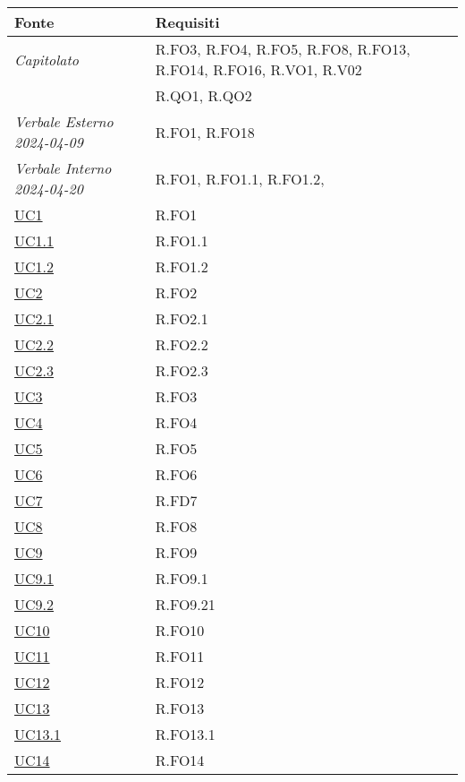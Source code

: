 \begin{longtable}{|P{4,5cm}|>{\arraybackslash}P{9cm}|}
  \hline
  \textbf{Fonte} & \textbf{Requisiti} \\
  \hline
  \emph{Capitolato} & R.FO3, R.FO4, R.FO5, R.FO8, R.FO13, R.FO14, R.FO16, R.VO1, R.V02 \\
  \hline
  \NdP{} & R.QO1, R.QO2 \\
  \hline
  \emph{Verbale Esterno 2024-04-09} & R.FO1, R.FO18 \\
  \hline
  \emph{Verbale Interno 2024-04-20} & R.FO1, R.FO1.1, R.FO1.2,  \\
  \hline
  \hyperref[UC1]{UC1} & R.FO1 \\
  \hline
  \hyperref[UC1point1]{UC1.1} & R.FO1.1 \\
  \hline
  \hyperref[UC1]{UC1.2} & R.FO1.2 \\
  \hline
  \hyperref[UC2]{UC2} & R.FO2 \\
  \hline
  \hyperref[UC2point1]{UC2.1} & R.FO2.1 \\
  \hline
  \hyperref[UC2point2]{UC2.2} & R.FO2.2 \\
  \hline
  \hyperref[UC2point3]{UC2.3} & R.FO2.3 \\
  \hline
  \hyperref[UC3]{UC3} & R.FO3 \\
  \hline
  \hyperref[UC4]{UC4} & R.FO4 \\
  \hline
  \hyperref[UC5]{UC5} & R.FO5 \\
  \hline
  \hyperref[UC6]{UC6} & R.FO6 \\
  \hline
  \hyperref[UC7]{UC7} & R.FD7 \\
  \hline
  \hyperref[UC8]{UC8} & R.FO8 \\
  \hline
  \hyperref[UC9]{UC9} & R.FO9 \\
  \hline
  \hyperref[UC9point1]{UC9.1} & R.FO9.1 \\
  \hline
  \hyperref[UC9point2]{UC9.2} & R.FO9.21 \\
  \hline
  \hyperref[UC10]{UC10} & R.FO10 \\
  \hline
  \hyperref[UC11]{UC11} & R.FO11 \\
  \hline
  \hyperref[UC12]{UC12} & R.FO12 \\
  \hline
  \hyperref[UC13]{UC13} & R.FO13 \\
  \hline
  \hyperref[UC13point1]{UC13.1} & R.FO13.1 \\
  \hline
  \hyperref[UC14]{UC14} & R.FO14 \\
  \hline


\end{longtable}
